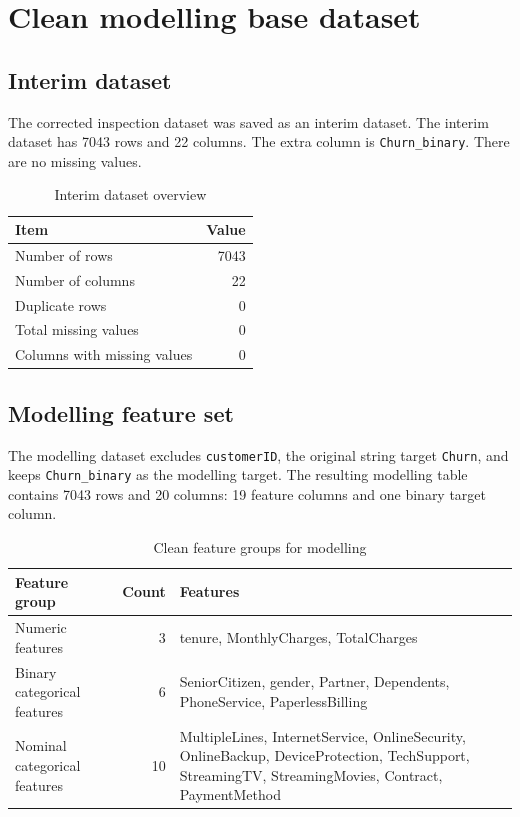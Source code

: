 \section{Clean modelling base dataset}

\subsection{Interim dataset}

The corrected inspection dataset was saved as an interim dataset. The interim dataset has 7043 rows and 22 columns. The extra column is \texttt{Churn\_binary}. There are no missing values.

\begin{table}[H]
\centering
\caption{Interim dataset overview}
\begin{tabular}{lr}
\toprule
Item & Value \\
\midrule
Number of rows & 7043 \\
Number of columns & 22 \\
Duplicate rows & 0 \\
Total missing values & 0 \\
Columns with missing values & 0 \\
\bottomrule
\end{tabular}
\end{table}

\subsection{Modelling feature set}

The modelling dataset excludes \texttt{customerID}, the original string target \texttt{Churn}, and keeps \texttt{Churn\_binary} as the modelling target. The resulting modelling table contains 7043 rows and 20 columns: 19 feature columns and one binary target column.

\begin{table}[H]
\centering
\caption{Clean feature groups for modelling}
\begin{tabular}{lrp{9cm}}
\toprule
Feature group & Count & Features \\
\midrule
Numeric features & 3 & tenure, MonthlyCharges, TotalCharges \\
Binary categorical features & 6 & SeniorCitizen, gender, Partner, Dependents, PhoneService, PaperlessBilling \\
Nominal categorical features & 10 & MultipleLines, InternetService, OnlineSecurity, OnlineBackup, DeviceProtection, TechSupport, StreamingTV, StreamingMovies, Contract, PaymentMethod \\
\bottomrule
\end{tabular}
\end{table}


